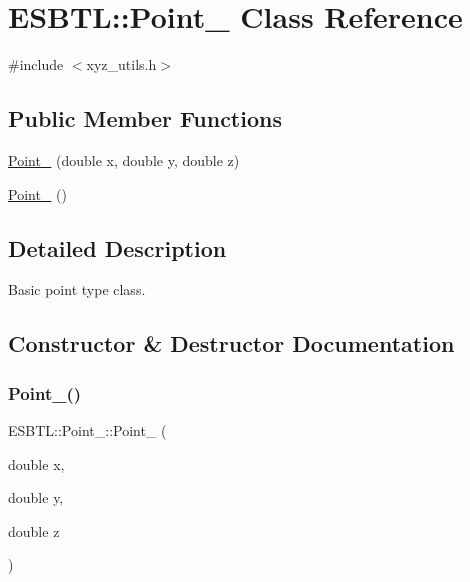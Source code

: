 \hypertarget{classESBTL_1_1Point__3}{}\section{E\+S\+B\+TL\+:\+:Point\+\_ Class Reference}
\label{classESBTL_1_1Point__3}


{\ttfamily \#include $<$xyz\+\_\+utils.\+h$>$}

\subsection*{Public Member Functions}
\begin{DoxyCompactItemize}
\item 
\hyperlink{classESBTL_1_1Point__3_a6301da93e771bac8df5ee4205a89c77d}{Point\+\_} (double x, double y, double z)
\item 
\hyperlink{classESBTL_1_1Point__3_acf3a956281639ad03a4b1255e81fec12}{Point\+\_} ()
\end{DoxyCompactItemize}


\subsection{Detailed Description}
Basic point type class. 

\subsection{Constructor \& Destructor Documentation}
\mbox{\label{classESBTL_1_1Point__3_a6301da93e771bac8df5ee4205a89c77d}} 
\subsubsection{\texorpdfstring{Point\+\_()}{Point\_3()}\hspace{0.1cm}{\footnotesize\ttfamily [1/2]}}
{\footnotesize\ttfamily E\+S\+B\+T\+L\+::\+Point\+\_\+::\+Point\+\_ (\begin{DoxyParamCaption}\item[{double}]{x,  }\item[{double}]{y,  }\item[{double}]{z }\end{DoxyParamCaption})\hspace{0.3cm}{\ttfamily [inline]}}

